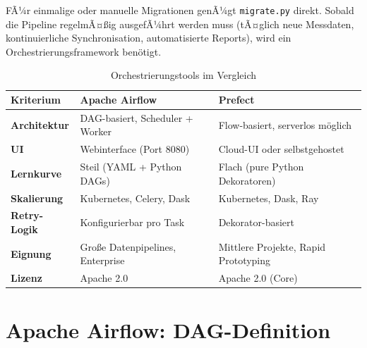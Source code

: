 ﻿\documentclass[12pt,a4paper]{report}
\theoremstyle{definition}
\theoremstyle{remark}
\newcommand{\code}[1]{\texttt{#1}}
\begin{document}
FÃ¼r einmalige oder manuelle Migrationen genÃ¼gt \code{migrate.py}
direkt. Sobald die Pipeline regelmÃ¤\ss{}ig ausgefÃ¼hrt werden muss
(tÃ¤glich neue Messdaten, kontinuierliche Synchronisation, automatisierte
Reports), wird ein Orchestrierungsframework ben\"otigt.

\begin{table}[H]
\centering
\caption{Orchestrierungstools im Vergleich}
\label{tab:orch}
\renewcommand{\arraystretch}{1.3}
\begin{tabularx}{\linewidth}{>{\bfseries\footnotesize}l >{\footnotesize}X >{\footnotesize}X}
\toprule
Kriterium          & Apache Airflow                     & Prefect \\
\midrule
Architektur        & DAG-basiert, Scheduler + Worker    & Flow-basiert, serverlos m\"oglich \\
UI                 & Webinterface (Port 8080)           & Cloud-UI oder selbstgehostet \\
Lernkurve          & Steil (YAML + Python DAGs)         & Flach (pure Python Dekoratoren) \\
Skalierung         & Kubernetes, Celery, Dask           & Kubernetes, Dask, Ray \\
Retry-Logik        & Konfigurierbar pro Task            & Dekorator-basiert \\
Eignung            & Gro\ss{}e Datenpipelines, Enterprise & Mittlere Projekte, Rapid Prototyping \\
Lizenz             & Apache 2.0                         & Apache 2.0 (Core) \\
\bottomrule
\end{tabularx}
\end{table}

\section{Apache Airflow: DAG-Definition}
\end{document}
